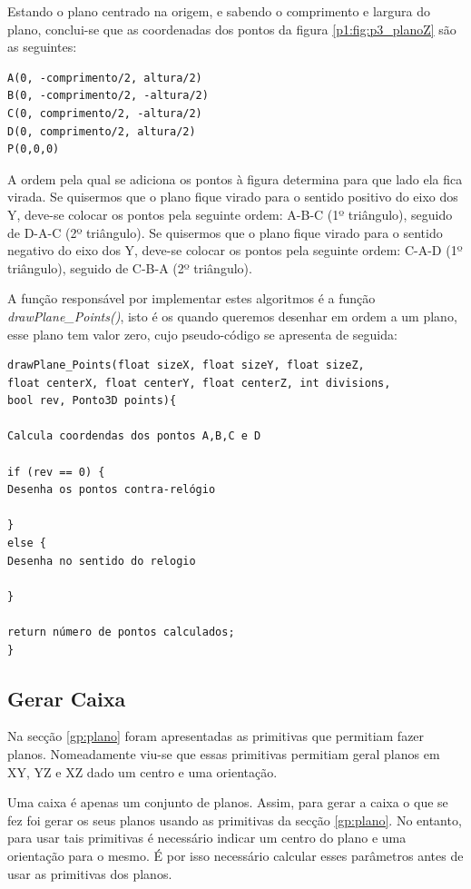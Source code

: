 Estando o plano centrado na origem, e sabendo o comprimento e largura do plano, conclui-se que as coordenadas dos pontos da figura \ref{p1:fig:p3_planoZ} são as seguintes:

\begin{Verbatim}
A(0, -comprimento/2, altura/2)
B(0, -comprimento/2, -altura/2)
C(0, comprimento/2, -altura/2)
D(0, comprimento/2, altura/2)
P(0,0,0)
\end{Verbatim}


A ordem pela qual se adiciona os pontos à figura determina para que lado ela fica virada. Se quisermos que o plano fique virado para o sentido positivo do eixo dos Y, deve-se colocar os pontos pela seguinte ordem: A-B-C (1º triângulo), seguido de D-A-C (2º triângulo). Se quisermos que o plano fique virado para o sentido negativo do eixo dos Y, deve-se colocar os pontos pela seguinte ordem: C-A-D (1º triângulo), seguido de C-B-A (2º triângulo).

A função responsável por implementar estes algoritmos é a função \textit{drawPlane\_Points()}, isto é os quando queremos desenhar em ordem a um plano, esse plano tem valor zero, cujo pseudo-código se apresenta de seguida:

\begin{Verbatim}
drawPlane_Points(float sizeX, float sizeY, float sizeZ, 
float centerX, float centerY, float centerZ, int divisions,
bool rev, Ponto3D points){

Calcula coordendas dos pontos A,B,C e D

if (rev == 0) {
Desenha os pontos contra-relógio

}
else {
Desenha no sentido do relogio

}

return número de pontos calculados;
}
\end{Verbatim}



\subsection{Gerar Caixa}


Na secção \ref{gp:plano} foram apresentadas as primitivas que permitiam fazer planos. Nomeadamente viu-se que essas primitivas permitiam geral planos em XY, YZ e XZ dado um centro e uma orientação.

Uma caixa é apenas um conjunto de planos. Assim, para gerar a caixa o que se fez foi gerar os seus planos usando as primitivas da secção \ref{gp:plano}. No entanto, para usar tais primitivas é necessário indicar um centro do plano e uma orientação para o mesmo. É por isso necessário calcular esses parâmetros antes de usar as primitivas dos planos.

